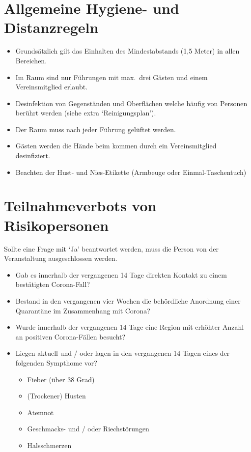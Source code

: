 \documentclass[10pt,a4paper]{scrartcl}
\begin{document}
\section{Allgemeine Hygiene- und Distanzregeln}
\begin{itemize}
\item Grundsätzlich gilt das Einhalten des Mindestabstands (1,5 Meter) in allen Bereichen.
\item Im Raum sind nur Führungen mit max.\ drei Gästen und einem Vereinsmitglied erlaubt.
\item Desinfektion von Gegenständen und Oberflächen welche häufig von Personen berührt werden (siehe extra `Reinigungsplan').
\item Der Raum muss nach jeder Führung gelüftet werden.
\item Gästen werden die Hände beim kommen durch ein Vereinsmitglied desinfiziert.
\item Beachten der Hust- und Nies-Etikette (Armbeuge oder Einmal-Taschentuch)
\end{itemize}




\section{Teilnahmeverbots von Risikopersonen}
Sollte eine Frage mit `Ja' beantwortet werden, muss die Person von der Veranstaltung ausgeschlossen werden.
\begin{itemize}
  \item Gab es innerhalb der vergangenen 14 Tage direkten Kontakt zu einem bestätigten Corona-Fall?
  \item Bestand in den vergangenen vier Wochen die behördliche Anordnung einer Quarantäne im Zusammenhang mit Corona?
  \item Wurde innerhalb der vergangenen 14 Tage eine Region mit erhöhter Anzahl an positiven Corona-Fällen besucht?
  \item Liegen aktuell und / oder lagen in den vergangenen 14 Tagen eines der folgenden Sympthome vor?
  \begin{itemize}
    \item Fieber (über 38 Grad)
    \item (Trockener) Husten
    \item Atemnot
    \item Geschmacks- und / oder Riechstörungen
    \item Halsschmerzen
  \end{itemize}
\end{itemize}
\end{document}
